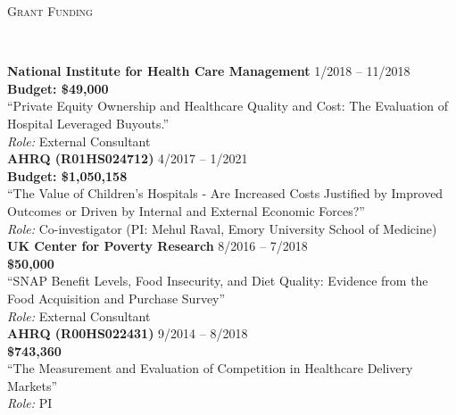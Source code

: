 \documentclass[9pt]{article}
\newenvironment{changemargin}[2]{%
  \begin{list}{}{%
    \setlength{\topsep}{0pt}%
    \setlength{\leftmargin}{#1}%
    \setlength{\rightmargin}{#2}%
    \setlength{\listparindent}{\parindent}%
    \setlength{\itemindent}{\parindent}%
    \setlength{\parsep}{\parskip}%
  }%
  \item[]}{\end{list}
}
\newcommand{\lineover}{
	\begin{changemargin}{-0.05in}{-0.05in}
		\vspace*{-8pt}
		\hrulefill \\
		\vspace*{-2pt}
	\end{changemargin}
}
\newcommand{\header}[1]{
	\begin{changemargin}{-0.5in}{-0.5in}
		\scshape{#1}\\
  	\lineover
	\end{changemargin}
}
\newenvironment{body} {
	\vspace*{-16pt}
	\begin{changemargin}{-0.25in}{-0.5in}
  }	
	{\end{changemargin}
}
\begin{document}
\header{Grant Funding}
\begin{body}

\vspace{14pt}

 \textbf{National Institute for Health Care Management} \hfill 1/2018 -- 11/2018\\
 \textbf{Budget: \$49,000} \\
 ``Private Equity Ownership and Healthcare Quality and Cost: The Evaluation of Hospital Leveraged Buyouts.'' \\
 \textit{Role:} External Consultant \\

 \medskip
 \textbf{AHRQ (R01HS024712)} \hfill 4/2017 -- 1/2021 \\
 \textbf{Budget: \$1,050,158} \\
 ``The Value of Children's Hospitals - Are Increased Costs Justified by Improved Outcomes or Driven by Internal and External Economic Forces?'' \\
 \textit{Role:} Co-investigator (PI: Mehul Raval, Emory University School of Medicine) \\

 \medskip
 \textbf{UK Center for Poverty Research} \hfill 8/2016 -- 7/2018 \\
 \textbf{\$50,000} \\
 ``SNAP Benefit Levels, Food Insecurity, and Diet Quality: Evidence from the Food Acquisition and Purchase Survey'' \\
 \textit{Role:} External Consultant \\

 \medskip
 \textbf{AHRQ (R00HS022431)} \hfill 9/2014 -- 8/2018 \\
 \textbf{\$743,360} \\
 ``The Measurement and Evaluation of Competition in Healthcare Delivery Markets'' \\
 \textit{Role:} PI \\


\end{body}
\end{document}
